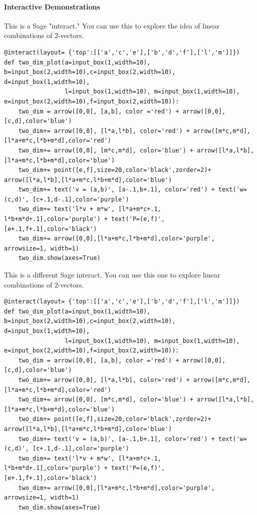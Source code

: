 \documentclass[10pt,]{book}
\theoremstyle{plain}
\numberwithin{equation}{section}
\begin{document}
\paragraph[Interactive Demonstrations]{Interactive Demonstrations}\label{paragraph-5}
This is a Sage "interact." You can use this to explore the idea of
            linear combinations of \(2\)-vectors.%
\begin{lstlisting}[style=sageinput]
@interact(layout= {'top':[['a','c','e'],['b','d','f'],['l','m']]})
def two_dim_plot(a=input_box(1,width=10), b=input_box(2,width=10),c=input_box(2,width=10), d=input_box(1,width=10),
                 l=input_box(1,width=10), m=input_box(1,width=10), e=input_box(2,width=10),f=input_box(2,width=10)):
    two_dim = arrow([0,0], [a,b], color ='red') + arrow([0,0],[c,d],color='blue')
    two_dim+= arrow([0,0], [l*a,l*b], color='red') + arrow([m*c,m*d],[l*a+m*c,l*b+m*d],color='red')
    two_dim+= arrow([0,0], [m*c,m*d], color='blue') + arrow([l*a,l*b],[l*a+m*c,l*b+m*d],color='blue')
    two_dim+= point([e,f],size=20,color='black',zorder=2)+ arrow([l*a,l*b],[l*a+m*c,l*b+m*d],color='blue')
    two_dim+= text('v = (a,b)', [a-.1,b+.1], color='red') + text('w=(c,d)', [c+.1,d-.1],color='purple')
    two_dim+= text('l*v + m*w', [l*a+m*c+.1, l*b+m*d+.1],color='purple') + text('P=(e,f)', [e+.1,f+.1],color='black')
    two_dim+= arrow([0,0],[l*a+m*c,l*b+m*d],color='purple', arrowsize=1, width=1)
    two_dim.show(axes=True)
\end{lstlisting}
\par
This is a different Sage interact. You can use this one to
                explore linear combinations of \(2\)-vectors.
\begin{lstlisting}[style=sageinput]
@interact(layout= {'top':[['a','c','e'],['b','d','f'],['l','m']]})
def two_dim_plot(a=input_box(1,width=10), b=input_box(2,width=10),c=input_box(2,width=10), d=input_box(1,width=10),
                 l=input_box(1,width=10), m=input_box(1,width=10), e=input_box(2,width=10),f=input_box(2,width=10)):
    two_dim = arrow([0,0], [a,b], color ='red') + arrow([0,0],[c,d],color='blue')
    two_dim+= arrow([0,0], [l*a,l*b], color='red') + arrow([m*c,m*d],[l*a+m*c,l*b+m*d],color='red')
    two_dim+= arrow([0,0], [m*c,m*d], color='blue') + arrow([l*a,l*b],[l*a+m*c,l*b+m*d],color='blue')
    two_dim+= point([e,f],size=20,color='black',zorder=2)+ arrow([l*a,l*b],[l*a+m*c,l*b+m*d],color='blue')
    two_dim+= text('v = (a,b)', [a-.1,b+.1], color='red') + text('w=(c,d)', [c+.1,d-.1],color='purple')
    two_dim+= text('l*v + m*w', [l*a+m*c+.1, l*b+m*d+.1],color='purple') + text('P=(e,f)', [e+.1,f+.1],color='black')
    two_dim+= arrow([0,0],[l*a+m*c,l*b+m*d],color='purple', arrowsize=1, width=1)
    two_dim.show(axes=True)
\end{lstlisting}
\end{document}
